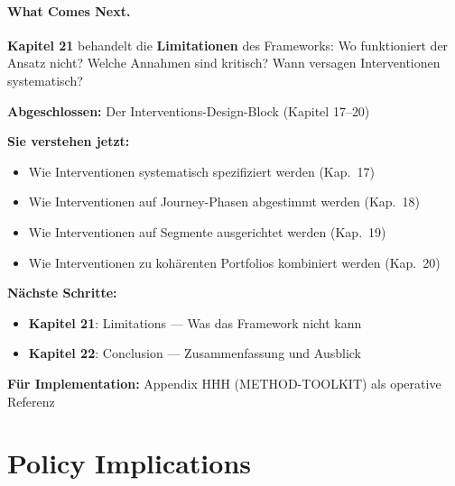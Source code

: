 \paragraph{What Comes Next.}
\textbf{Kapitel 21} behandelt die \textbf{Limitationen} des Frameworks: Wo funktioniert der Ansatz nicht? Welche Annahmen sind kritisch? Wann versagen Interventionen systematisch?



\begin{tcolorbox}[colback=gray!5!white, colframe=gray!75!black,
    title=Empfohlene Lesepfade]

\textbf{Abgeschlossen:} Der Interventions-Design-Block (Kapitel 17--20)

\textbf{Sie verstehen jetzt:}
\begin{itemize}[nosep]
\item Wie Interventionen systematisch spezifiziert werden (Kap.\ 17)
\item Wie Interventionen auf Journey-Phasen abgestimmt werden (Kap.\ 18)
\item Wie Interventionen auf Segmente ausgerichtet werden (Kap.\ 19)
\item Wie Interventionen zu kohärenten Portfolios kombiniert werden (Kap.\ 20)
\end{itemize}

\textbf{Nächste Schritte:}
\begin{itemize}[nosep]
\item \textbf{Kapitel 21}: Limitations --- Was das Framework nicht kann
\item \textbf{Kapitel 22}: Conclusion --- Zusammenfassung und Ausblick
\end{itemize}

\textbf{Für Implementation:} Appendix HHH (METHOD-TOOLKIT) als operative Referenz
\end{tcolorbox}



\section*{Policy Implications}

